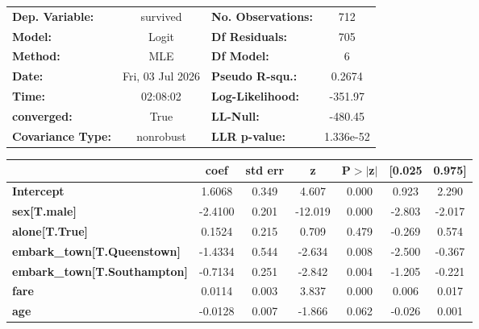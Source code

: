 \documentclass[
  letterpaper,
  DIV=11,
  numbers=noendperiod]{scrreprt}
\begin{document}
\begin{center}
\begin{tabular}{lclc}
\toprule
\textbf{Dep. Variable:}              &     survived     & \textbf{  No. Observations:  } &      712    \\
\textbf{Model:}                      &      Logit       & \textbf{  Df Residuals:      } &      705    \\
\textbf{Method:}                     &       MLE        & \textbf{  Df Model:          } &        6    \\
\textbf{Date:}                       & Fri, 03 Jul 2026 & \textbf{  Pseudo R-squ.:     } &   0.2674    \\
\textbf{Time:}                       &     02:08:02     & \textbf{  Log-Likelihood:    } &   -351.97   \\
\textbf{converged:}                  &       True       & \textbf{  LL-Null:           } &   -480.45   \\
\textbf{Covariance Type:}            &    nonrobust     & \textbf{  LLR p-value:       } & 1.336e-52   \\
\bottomrule
\end{tabular}
\begin{tabular}{lcccccc}
                                     & \textbf{coef} & \textbf{std err} & \textbf{z} & \textbf{P$> |$z$|$} & \textbf{[0.025} & \textbf{0.975]}  \\
\midrule
\textbf{Intercept}                   &       1.6068  &        0.349     &     4.607  &         0.000        &        0.923    &        2.290     \\
\textbf{sex[T.male]}                 &      -2.4100  &        0.201     &   -12.019  &         0.000        &       -2.803    &       -2.017     \\
\textbf{alone[T.True]}               &       0.1524  &        0.215     &     0.709  &         0.479        &       -0.269    &        0.574     \\
\textbf{embark\_town[T.Queenstown]}  &      -1.4334  &        0.544     &    -2.634  &         0.008        &       -2.500    &       -0.367     \\
\textbf{embark\_town[T.Southampton]} &      -0.7134  &        0.251     &    -2.842  &         0.004        &       -1.205    &       -0.221     \\
\textbf{fare}                        &       0.0114  &        0.003     &     3.837  &         0.000        &        0.006    &        0.017     \\
\textbf{age}                         &      -0.0128  &        0.007     &    -1.866  &         0.062        &       -0.026    &        0.001     \\
\bottomrule
\end{tabular}
\end{center}
\end{document}
